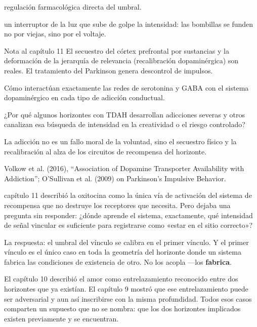 \begin{fisica}
 regulación farmacológica directa del umbral.

 un interruptor de la luz que sube de golpe la intensidad: las bombillas se funden no por viejas, sino por el voltaje.
\end{fisica}
\begin{notacap}{Nota al capítulo 11}
 El secuestro del córtex prefrontal por sustancias y la deformación de la jerarquía de relevancia (recalibración dopaminérgica) son reales. El tratamiento del Parkinson genera descontrol de impulsos.

 Cómo interactúan exactamente las redes de serotonina y GABA con el sistema dopaminérgico en cada tipo de adicción conductual.

 ¿Por qué algunos horizontes con TDAH desarrollan adicciones severas y otros canalizan esa búsqueda de intensidad en la creatividad o el riesgo controlado?

 La adicción no es un fallo moral de la voluntad, sino el secuestro físico y la recalibración al alza de los circuitos de recompensa del horizonte.

 Volkow et al. (2016), “Association of Dopamine Transporter Availability with Addiction”; O’Sullivan et al. (2009) on Parkinson’s Impulsive Behavior.
\end{notacap}
\noindent {} capítulo 11 describió la oxitocina como la única vía de activación del sistema de recompensa que no destruye los receptores que necesita. Pero dejaba una pregunta sin responder: ¿dónde aprende el sistema, exactamente, qué intensidad de señal vincular es suficiente para registrarse como «estar en el sitio correcto»?

La respuesta: el umbral del vínculo se calibra en el primer vínculo. Y el primer vínculo es el único caso en toda la geometría del horizonte donde un sistema fabrica las condiciones de existencia de otro. No los acopla —los \textbf{fabrica}.

\noindent El capítulo 10 describió el amor como entrelazamiento reconocido entre dos horizontes que ya existían. El capítulo 9 mostró que ese entrelazamiento puede ser adversarial y aun así inscribirse con la misma profundidad. Todos esos casos comparten un supuesto que no se nombra: que los dos horizontes implicados existen previamente y se encuentran.

